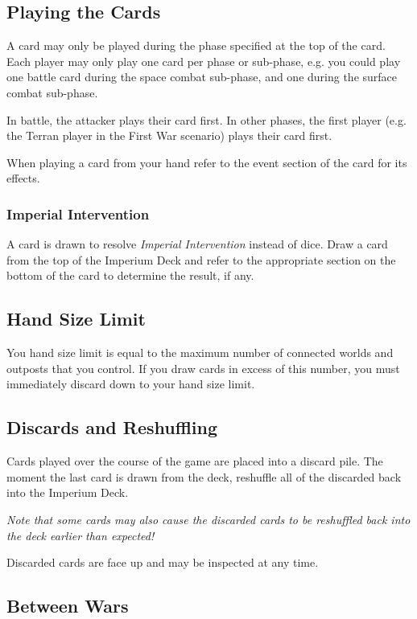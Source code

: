 \subsection{Playing the Cards}

A card may only be played during the phase specified at the top of the card. Each player may only play one card per phase or sub-phase, e.g. you could play one battle card during the space combat sub-phase, and one during the surface combat sub-phase.

In battle, the attacker plays their card first. In other phases, the first player (e.g. the Terran player in the First War scenario) plays their card first.

When playing a card from your hand refer to the event section of the card for its effects.

\subsubsection{Imperial Intervention}

A card is drawn to resolve \textit{Imperial Intervention} instead of dice. Draw a card from the top of the Imperium Deck and refer to the appropriate section on the bottom of the card to determine the result, if any.

\subsection{Hand Size Limit}

You hand size limit is equal to the maximum number of connected worlds and outposts that you control. If you draw cards in excess of this number, you must immediately discard down to your hand size limit.

\subsection{Discards and Reshuffling}

Cards played over the course of the game are placed into a discard pile. The moment the last card is drawn from the deck, reshuffle all of the discarded back into the Imperium Deck.

\textit{Note that some cards may also cause the discarded cards to be reshuffled back into the deck earlier than expected!}

Discarded cards are face up and may be inspected at any time.

\subsection{Between Wars}

